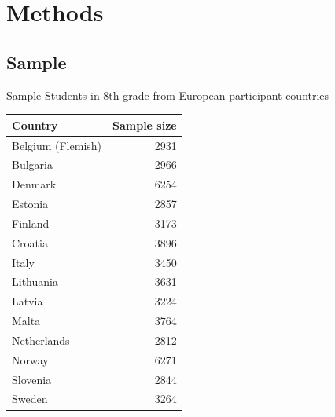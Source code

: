 \documentclass[11pt,t]{beamer}
\begin{document}
\section{Methods}
\subsection{Sample}
\begin{frame}{Sample}
\vspace{-5pt}
Students in 8th grade from European participant countries
\small
\begin{center}
\begin{tabular}{l r}
Country & Sample size\\
\hline
Belgium (Flemish) & 2931\\
Bulgaria & 2966\\
Denmark & 6254\\
Estonia & 2857\\
Finland & 3173\\
Croatia & 3896\\
Italy & 3450\\
Lithuania & 3631\\
Latvia & 3224\\
Malta & 3764\\Netherlands & 2812\\
Norway & 6271\\
Slovenia & 2844\\
Sweden & 3264\\
\hline

\end{tabular}
\end{center}
\vspace{3.1mm} 
\end{frame}
\end{document}
